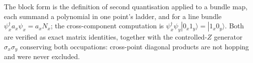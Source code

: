 The block form is the definition of second quantisation applied to a bundle map, each summand a polynomial in one point's ladder, and for a line bundle $\psi^{\dagger}_x a_x \psi_x = a_x N_x$; the cross-component computation is $\psi^{\dagger}_x\psi_y|0_x 1_y\rangle = |1_x 0_y\rangle$. Both are verified as exact matrix identities, together with the controlled-$Z$ generator $\sigma_x\sigma_y$ conserving both occupations: cross-point diagonal products are not hopping and were never excluded.
